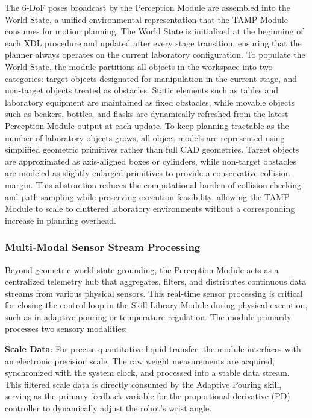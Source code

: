 \documentclass{ieeeaccess}
\begin{document}
The 6-DoF poses broadcast by the Perception Module are assembled into the World State, a unified environmental representation that the TAMP Module consumes for motion planning. The World State is initialized at the beginning of each XDL procedure and updated after every stage transition, ensuring that the planner always operates on the current laboratory configuration. To populate the World State, the module partitions all objects in the workspace into two categories: target objects designated for manipulation in the current stage, and non-target objects treated as obstacles. Static elements such as tables and laboratory equipment are maintained as fixed obstacles, while movable objects such as beakers, bottles, and flasks are dynamically refreshed from the latest Perception Module output at each update. To keep planning tractable as the number of laboratory objects grows, all object models are represented using simplified geometric primitives rather than full CAD geometries. Target objects are approximated as axis-aligned boxes or cylinders, while non-target obstacles are modeled as slightly enlarged primitives to provide a conservative collision margin. This abstraction reduces the computational burden of collision checking and path sampling while preserving execution feasibility, allowing the TAMP Module to scale to cluttered laboratory environments without a corresponding increase in planning overhead.


\subsubsection{Multi-Modal Sensor Stream Processing}\label{sec:3.3.3}

Beyond geometric world-state grounding, the Perception Module acts as a centralized telemetry hub that aggregates, filters, and distributes continuous data streams from various physical sensors. This real-time sensor processing is critical for closing the control loop in the Skill Library Module during physical execution, such as in adaptive pouring or temperature regulation. The module primarily processes two sensory modalities:

\textbf{Scale Data}: For precise quantitative liquid transfer, the module interfaces with an electronic precision scale. The raw weight measurements are acquired, synchronized with the system clock, and processed into a stable data stream. This filtered scale data is directly consumed by the Adaptive Pouring skill, serving as the primary feedback variable for the proportional-derivative (PD) controller to dynamically adjust the robot's wrist angle.
\end{document}
